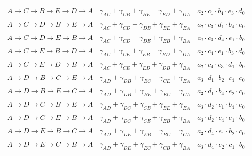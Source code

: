 \documentclass[msc,oneside]{ubcthesis}
\begin{document}
\begin{table}[h]
\begin{tabular}{|c|c|c|}
$A \rightarrow C \rightarrow B \rightarrow E \rightarrow D \rightarrow A$ & $ \gamma_{AC} + \gamma_{CB} + \gamma_{BE} + \gamma_{ED} + \gamma_{DA}$ & $a_2  \cdot c_1 \cdot b_4 \cdot e_3 \cdot d_0$ \\
$A \rightarrow C \rightarrow D \rightarrow B \rightarrow E \rightarrow A$ & $ \gamma_{AC} + \gamma_{CD} + \gamma_{DB} + \gamma_{BE} + \gamma_{EA}$ & $a_2  \cdot c_3 \cdot d_1 \cdot b_4 \cdot e_0$ \\
$A \rightarrow C \rightarrow D \rightarrow E \rightarrow B \rightarrow A$ & $ \gamma_{AC} + \gamma_{CD} + \gamma_{DE} + \gamma_{EB} + \gamma_{BA}$ & $a_2  \cdot c_3 \cdot d_4 \cdot e_1 \cdot b_0$ \\
$A \rightarrow C \rightarrow E \rightarrow B \rightarrow D \rightarrow A$ & $ \gamma_{AC} + \gamma_{CE} + \gamma_{EB} + \gamma_{BD} + \gamma_{DA}$ & $a_2  \cdot c_4 \cdot e_1 \cdot b_3 \cdot d_0$ \\
$A \rightarrow C \rightarrow E \rightarrow D \rightarrow B \rightarrow A$ & $ \gamma_{AC} + \gamma_{CE} + \gamma_{ED} + \gamma_{DB} + \gamma_{BA}$ & $a_2  \cdot c_4 \cdot e_3 \cdot d_1 \cdot b_0$ \\
$A \rightarrow D \rightarrow B \rightarrow C \rightarrow E \rightarrow A$ & $ \gamma_{AD} + \gamma_{DB} + \gamma_{BC} + \gamma_{CE} + \gamma_{EA}$ & $a_3  \cdot d_1 \cdot b_2 \cdot c_4 \cdot e_0$ \\
$A \rightarrow D \rightarrow B \rightarrow E \rightarrow C \rightarrow A$ & $ \gamma_{AD} + \gamma_{DB} + \gamma_{BE} + \gamma_{EC} + \gamma_{CA}$ & $a_3  \cdot d_1 \cdot b_4 \cdot e_2 \cdot c_0$ \\
$A \rightarrow D \rightarrow C \rightarrow B \rightarrow E \rightarrow A$ & $ \gamma_{AD} + \gamma_{DC} + \gamma_{CB} + \gamma_{BE} + \gamma_{EA}$ & $a_3  \cdot d_2 \cdot c_1 \cdot b_4 \cdot e_0$ \\
$A \rightarrow D \rightarrow C \rightarrow E \rightarrow B \rightarrow A$ & $ \gamma_{AD} + \gamma_{DC} + \gamma_{CE} + \gamma_{EB} + \gamma_{BA}$ & $a_3  \cdot d_2 \cdot c_4 \cdot e_1 \cdot b_0$ \\
$A \rightarrow D \rightarrow E \rightarrow B \rightarrow C \rightarrow A$ & $ \gamma_{AD} + \gamma_{DE} + \gamma_{EB} + \gamma_{BC} + \gamma_{CA}$ & $a_3  \cdot d_4 \cdot e_1 \cdot b_2 \cdot c_0$ \\
$A \rightarrow D \rightarrow E \rightarrow C \rightarrow B \rightarrow A$ & $ \gamma_{AD} + \gamma_{DE} + \gamma_{EC} + \gamma_{CB} + \gamma_{BA}$ & $a_3  \cdot d_4 \cdot e_2 \cdot c_1 \cdot b_0$ \\

\end{tabular}
\end{table}
\end{document}
